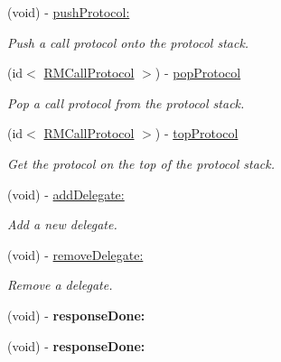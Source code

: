 \begin{DoxyCompactItemize}
(void) -\/ \hyperlink{interface_r_m_call_afb23a22f89df78e62f45f2af2dd41623}{pushProtocol:}
\begin{DoxyCompactList}\small\item\em Push a call protocol onto the protocol stack. \item\end{DoxyCompactList}\item 
(id$<$ \hyperlink{protocol_r_m_call_protocol-p}{RMCallProtocol} $>$) -\/ \hyperlink{interface_r_m_call_a2f55cbd7d34e98e4dbc74e1d8d8facf8}{popProtocol}
\begin{DoxyCompactList}\small\item\em Pop a call protocol from the protocol stack. \item\end{DoxyCompactList}\item 
(id$<$ \hyperlink{protocol_r_m_call_protocol-p}{RMCallProtocol} $>$) -\/ \hyperlink{interface_r_m_call_a306021de3467cc71a876068cbed9d834}{topProtocol}
\begin{DoxyCompactList}\small\item\em Get the protocol on the top of the protocol stack. \item\end{DoxyCompactList}\item 
(void) -\/ \hyperlink{interface_r_m_call_a24b00b6c098e4c14b267fafb186d2493}{addDelegate:}
\begin{DoxyCompactList}\small\item\em Add a new delegate. \item\end{DoxyCompactList}\item 
(void) -\/ \hyperlink{interface_r_m_call_a134cc51db3b462b9108b30e449f8b5bb}{removeDelegate:}
\begin{DoxyCompactList}\small\item\em Remove a delegate. \item\end{DoxyCompactList}\item 
\hypertarget{interface_r_m_call_ad886fa1609a87c68a5d681942704e61d}{
(void) -\/ {\bfseries responseDone:}}
\label{interface_r_m_call_ad886fa1609a87c68a5d681942704e61d}

\item 
\hypertarget{interface_r_m_call_ad886fa1609a87c68a5d681942704e61d}{
(void) -\/ {\bfseries responseDone:}}
\label{interface_r_m_call_ad886fa1609a87c68a5d681942704e61d}

\end{DoxyCompactItemize}
